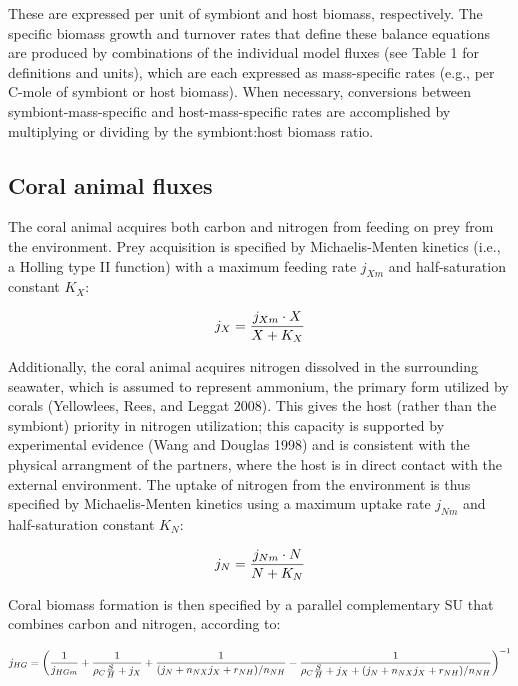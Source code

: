 \documentclass[]{elsarticle} %
\begin{document}
These are expressed per unit of symbiont and host biomass, respectively.
The specific biomass growth and turnover rates that define these balance
equations are produced by combinations of the individual model fluxes
(see Table 1 for definitions and units), which are each expressed as
mass-specific rates (e.g., per C-mole of symbiont or host biomass). When
necessary, conversions between symbiont-mass-specific and
host-mass-specific rates are accomplished by multiplying or dividing by
the symbiont:host biomass ratio.

\subsection{Coral animal fluxes}\label{coral-animal-fluxes}

The coral animal acquires both carbon and nitrogen from feeding on prey
from the environment. Prey acquisition is specified by Michaelis-Menten
kinetics (i.e., a Holling type II function) with a maximum feeding rate
\(j_{Xm}\) and half-saturation constant \(K_X\):

\begin{equation} j_X = {{j_{Xm} \cdot X} \over {X + K_X}} \end{equation}

Additionally, the coral animal acquires nitrogen dissolved in the
surrounding seawater, which is assumed to represent ammonium, the
primary form utilized by corals (Yellowlees, Rees, and Leggat 2008).
This gives the host (rather than the symbiont) priority in nitrogen
utilization; this capacity is supported by experimental evidence (Wang
and Douglas 1998) and is consistent with the physical arrangment of the
partners, where the host is in direct contact with the external
environment. The uptake of nitrogen from the environment is thus
specified by Michaelis-Menten kinetics using a maximum uptake rate
\(j_{Nm}\) and half-saturation constant \(K_N\):

\begin{equation} j_N = {{j_{Nm} \cdot N} \over {N + K_N}} \end{equation}

Coral biomass formation is then specified by a parallel complementary SU
that combines carbon and nitrogen, according to:

\begin{equation} j_{HG} = \bigg({1 \over j_{HGm}} + {1 \over {\rho_C{S \over H} + j_X}} + {1 \over {(j_N + n_{NX}j_X + r_{NH}) / n_{NH}}} - {1 \over {{\rho_C{S \over H} + j_X} + (j_N + n_{NX}j_X + r_{NH}) / n_{NH}}}\bigg)^{-1} \end{equation}
\end{document}

